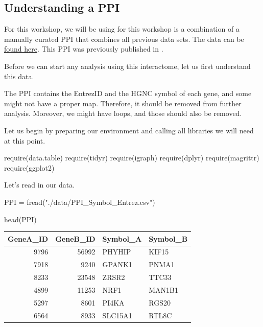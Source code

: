 \documentclass[
]{book}
\newenvironment{Shaded}{\begin{snugshade}}{\end{snugshade}}
\newcommand{\FunctionTok}[1]{\textcolor[rgb]{0.00,0.00,0.00}{#1}}
\newcommand{\NormalTok}[1]{#1}
\newcommand{\OtherTok}[1]{\textcolor[rgb]{0.56,0.35,0.01}{#1}}
\newcommand{\StringTok}[1]{\textcolor[rgb]{0.31,0.60,0.02}{#1}}
\begin{document}
\hypertarget{understanding-a-ppi}{%
\subsection{Understanding a PPI}\label{understanding-a-ppi}}

For this workshop, we will be using for this workshop is a combination of a manually curated PPI that combines all previous data sets. The data can be \href{https://github.com/deisygysi/NetMed_Workshop/blob/master/data/PPI_Symbol_Entrez.csv}{found here}. This PPI was previously published in \citet{Gysi2020a}.

Before we can start any analysis using this interactome, let us first understand this data.

The PPI contains the EntrezID and the HGNC symbol of each gene, and some might not have a proper map. Therefore, it should be removed from further analysis. Moreover, we might have loops, and those should also be removed.

Let us begin by preparing our environment and calling all libraries we will need at this point.

\begin{Shaded}
\begin{Highlighting}[]
\FunctionTok{require}\NormalTok{(data.table)}
\FunctionTok{require}\NormalTok{(tidyr)}
\FunctionTok{require}\NormalTok{(igraph)}
\FunctionTok{require}\NormalTok{(dplyr)}
\FunctionTok{require}\NormalTok{(magrittr)}
\FunctionTok{require}\NormalTok{(ggplot2)}
\end{Highlighting}
\end{Shaded}

Let's read in our data.

\begin{Shaded}
\begin{Highlighting}[]
\NormalTok{PPI }\OtherTok{=} \FunctionTok{fread}\NormalTok{(}\StringTok{"./data/PPI\_Symbol\_Entrez.csv"}\NormalTok{)}
\end{Highlighting}
\end{Shaded}

\begin{Shaded}
\begin{Highlighting}[]
\FunctionTok{head}\NormalTok{(PPI)}
\end{Highlighting}
\end{Shaded}

\begin{table}[H]
\centering
\begin{tabular}[t]{r|r|l|l}
\hline
GeneA\_ID & GeneB\_ID & Symbol\_A & Symbol\_B\\
\hline
9796 & 56992 & PHYHIP & KIF15\\
\hline
7918 & 9240 & GPANK1 & PNMA1\\
\hline
8233 & 23548 & ZRSR2 & TTC33\\
\hline
4899 & 11253 & NRF1 & MAN1B1\\
\hline
5297 & 8601 & PI4KA & RGS20\\
\hline
6564 & 8933 & SLC15A1 & RTL8C\\
\hline
\end{tabular}
\end{table}
\end{document}
